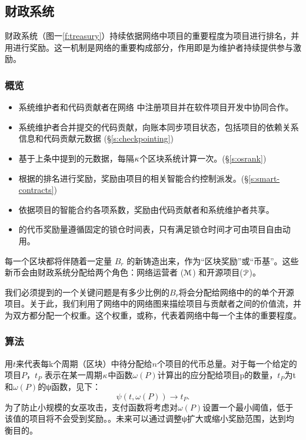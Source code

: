 \subsection{\Oscoin{}财政系统}
\label{s:treasury}

财政系统（图一\ref{f:treasury}）持续依据网络中项目的重要程度为项目进行排名，并用\oscoin{}进行奖励。这一机制是网络的重要构成部分，作用即是为维护者持续提供参与激励。

\subsubsection{概览}

\begin{itemize}
    \item 系统维护者和代码贡献者在网络 中注册项目并在软件项目开发中协同合作。
    \item 系统维护者合并提交的代码贡献，向账本同步项目状态，包括项目的依赖关系信息和代码贡献元数据 (\S\ref{s:checkpointing})
    \item 基于上条中提到的元数据，每隔$\kappa$个区块系统计算一次\osrank{}。(\S\ref{s:osrank})
    \item 根据\osrank{}的排名进行\oscoin{}奖励，奖励由项目的相关智能合约控制派发。(\S\ref{s:smart-contracts})
    \item 依据项目的智能合约各项系数，奖励由代码贡献者和系统维护者共享。
    \item \oscoin{}的代币奖励量遵循固定的锁仓时间表，只有满足锁仓时间才可由项目自由动用。
\end{itemize}

\medskip

\noindent 每一个区块都将伴随着一定量 $B_r$ 的新\oscoin{}铸造出来，作为“区块奖励”或“币基”。这些新币会由财政系统分配给两个角色：网络运营者 ($\mathcal{M}$) 和开源项目($\mathcal{P}$)。

我们必须提到的一个关键问题是有多少比例的$B_r$将会分配给网络中的的单个开源项目。关于此，我们利用了\oscoin{}网络中的网络图来描绘项目与贡献者之间的价值流，并为双方都分配一个权重。这个权重，或称\osrank{}，代表着网络中每一个主体的重要程度。

\subsubsection{算法} 用$t$来代表每k个周期（区块）中待分配给$n$个项目的代币总量。对于每一个给定的项目$P$，$t_P$ 表示在某一周期$\kappa$中\osrank{}函数$\omega(P)$计算出的应分配给项目p的\oscoin{}数量，$t_P$为t和$\omega(P)$的ψ函数，见下：
\[
    \psi(t, \omega(P)) \to t_P.
\]
为了防止小规模的女巫攻击，支付函数将考虑对$\omega(P)$设置一个最小阈值，低于该值的项目将不会受到奖励。。未来可以通过调整ψ扩大或缩小奖励范围，达到均衡目的。


